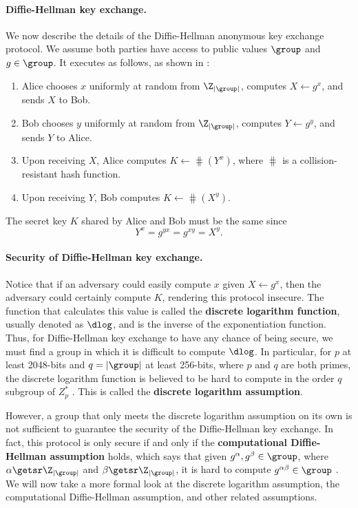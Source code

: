 \paragraph{Diffie-Hellman key exchange.} We now describe the details of the Diffie-Hellman anonymous key exchange protocol. We assume both parties have access to public values $\group$ and $g\in\group$. It executes as follows, as shown in :
\begin{enumerate}
	\item Alice chooses $x$ uniformly at random from $\Z_{|\group|}$, computes $X \gets g^x$, and sends $X$ to Bob.
	
	\item Bob chooses $y$ uniformly at random from $\Z_{|\group|}$, computes $Y \gets g^y$, and sends $Y$ to Alice.
	
	\item Upon receiving $X$, Alice computes $K \gets \hash(Y^x)$, where $\hash$ is a collision-resistant hash function. 
	
	\item Upon receiving $Y$, Bob computes $K \gets \hash(X^y)$. 
\end{enumerate}

The secret key $K$ shared by Alice and Bob must be the same since
\begin{equation*}
	Y^x = g^{yx} = g^{xy} = X^y.
\end{equation*}

\paragraph{Security of Diffie-Hellman key exchange.} Notice that if an adversary could easily compute $x$ given $X \gets g^x$, then the adversary could certainly compute $K$, rendering this protocol insecure. The function that calculates this value is called the \textbf{discrete logarithm function}, usually denoted as $\dlog$, and is the inverse of the exponentiation function. Thus, for Diffie-Hellman key exchange to have any chance of being secure, we must find a group in which it is difficult to compute $\dlog$. In particular, for $p$ at least 2048-bits and $q = |\group|$ at least 256-bits, where $p$ and $q$ are both primes, the discrete logarithm function is believed to be hard to compute in the order $q$ subgroup of $Z_p^*$ \cite{BonehShoupBook}. This is called the \textbf{discrete logarithm assumption}.

However, a group that only meets the discrete logarithm assumption on its own is not sufficient to guarantee the security of the Diffie-Hellman key exchange. In fact, this protocol is only secure if and only if the \textbf{computational Diffie-Hellman assumption} holds, which says that given $g^\alpha, g^\beta \in \group$, where $\alpha \getsr \Z_{|\group|}$ and $\beta \getsr \Z_{|\group|}$, it is hard to compute $g^{\alpha\beta} \in \group$ \cite{BonehShoupBook}. We will now take a more formal look at the discrete logarithm assumption, the computational Diffie-Hellman assumption, and other related assumptions. 

